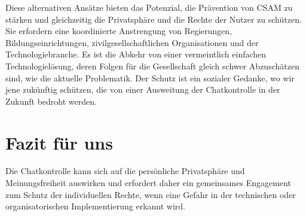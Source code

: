 \documentclass[a4paper]{article}
\begin{document}
\begin{itemize}

\end{itemize}
Diese alternativen Ansätze bieten das Potenzial, die Prävention von CSAM zu stärken und gleichzeitig die Privatsphäre und die Rechte der Nutzer zu schützen. Sie erfordern eine koordinierte Anstrengung von Regierungen, Bildungseinrichtungen, zivilgesellschaftlichen Organisationen und der Technologiebranche. Es ist die Abkehr von einer vermeintlich einfachen Technologielösung, deren Folgen für die Gesellschaft gleich schwer Abzuschätzen sind, wie die aktuelle Problematik. Der Schutz ist ein sozialer Gedanke, wo wir jene zukünftig schützen, die von einer Ausweitung der Chatkontrolle in der Zukunft bedroht werden. 

\section{Fazit für uns}
Die Chatkontrolle kann sich auf die persönliche Privatsphäre und Meinungsfreiheit auswirken und erfordert daher ein gemeinsames Engagement zum Schutz der individuellen Rechte, wenn eine Gefahr in der technischen oder organisatorischen Implementierung erkannt wird. 



\end{document}
